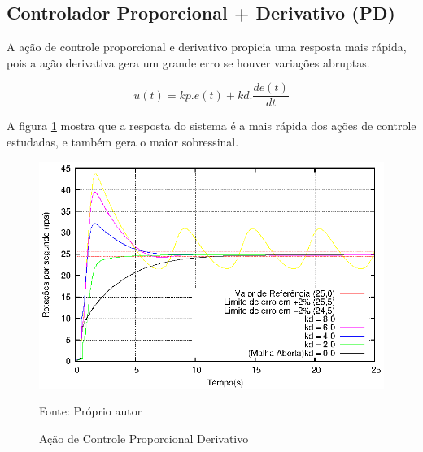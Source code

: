 












\subsection{ Controlador Proporcional + Derivativo (PD) }

A ação de controle proporcional e derivativo propicia uma resposta mais rápida, pois a ação derivativa gera um grande erro se houver variações abruptas.

\begin{equation}
u(t) = kp.e(t) + kd. \frac{d e(t)}{dt}
\end{equation}

A figura \ref{fig:acaoPD} mostra que a resposta do sistema é a mais rápida dos ações de controle estudadas, e também gera o maior sobressinal. 


\begin{figure}[!htb]
\centering
\caption{Ação de Controle Proporcional Derivativo}
\center\includegraphics[scale=1.1]{./imagens/acaoPD.eps}
\label{fig:acaoPD}

{\small Fonte: Próprio autor}
\end{figure}

